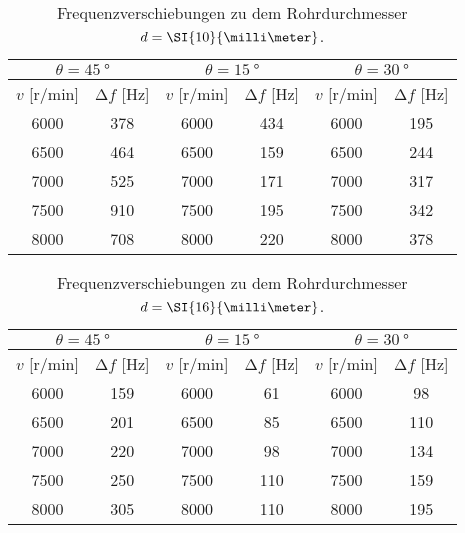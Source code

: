 \begin{table}
    \centering
    \caption{Frequenzverschiebungen zu dem Rohrdurchmesser $\protect d = \SI{10}{\milli\meter}$.}
    \label{tab:2}
    \begin{tabular}{c c || c c || c c}
        \hline
        \multicolumn{2}{c}{$\theta = \SI{45}{\degree}$} & \multicolumn{2}{c}{$\theta = \SI{15}{\degree}$} & \multicolumn{2}{c}{$\theta = \SI{30}{\degree}$}\\
        \midrule
        $v$ [$\si{{\text{r}}\per\minute}$]  & $\increment f$ [$\si{\hertz}$] & $v$ [$\si{{\text{r}}\per\minute}$]  & $\increment f$ [$\si{\hertz}$]&  $v$ [$\si{{\text{r}}\per\minute}$]  & $\increment f$ [$\si{\hertz}$]\\
        \midrule
        6000    &   378    & 6000  & 434  & 6000 & 195  \\ 
        6500    &   464    & 6500  & 159  & 6500 & 244  \\ 
        7000    &   525    & 7000  & 171  & 7000 & 317  \\ 
        7500    &   910    & 7500  & 195  & 7500 & 342  \\ 
        8000    &   708    & 8000  & 220  & 8000 & 378  \\  
        \bottomrule
    \end{tabular}
\end{table}

\begin{table}
    \centering
    \caption{Frequenzverschiebungen zu dem Rohrdurchmesser $\protect d = \SI{16}{\milli\meter}$.}
    \label{tab:3}
    \begin{tabular}{c c || c c || c c}
        \toprule
        \multicolumn{2}{c}{$\theta = \SI{45}{\degree}$} & \multicolumn{2}{c}{$\theta = \SI{15}{\degree}$} & \multicolumn{2}{c}{$\theta = \SI{30}{\degree}$}\\
        \midrule
        $v$ [$\si{{\text{r}}\per\minute}$]  & $\increment f$ [$\si{\hertz}$] & $v$ [$\si{{\text{r}}\per\minute}$]  & $\increment f$ [$\si{\hertz}$]&  $v$ [$\si{{\text{r}}\per\minute}$]  & $\increment f$ [$\si{\hertz}$]\\
        \midrule
        6000    &   159    & 6000  & 61   & 6000 &  98  \\ 
        6500    &   201    & 6500  & 85   & 6500 & 110  \\ 
        7000    &   220    & 7000  & 98   & 7000 & 134  \\ 
        7500    &   250    & 7500  & 110  & 7500 & 159  \\ 
        8000    &   305    & 8000  & 110  & 8000 & 195  \\  
        \bottomrule
    \end{tabular}
\end{table}


